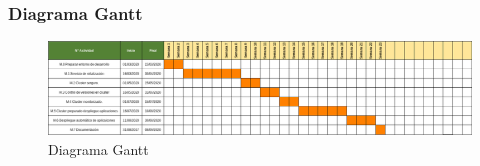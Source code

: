 \newpage
\subsubsection{Diagrama Gantt}
        \begin{figure}[!hbt]
                \centering
                \includegraphics[scale=0.4,angle=-90]{imagenes/Planificacion/gannt2.png}
                \caption[Diagrama Gantt]{Diagrama Gantt \cite{Gantt:online}} 
                \label{Diagrama Gannt}
        \end{figure}
\clearpage
